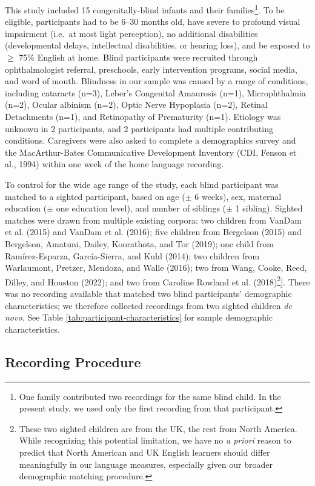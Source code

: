 \documentclass[
  man,floatsintext]{apa6}
\begin{document}
This study included 15 congenitally-blind infants and their families\footnote{One family contributed two recordings for the same blind child. In the present study, we used only the first recording from that participant.}. To be eligible, participants had to be 6--30 months old, have severe to profound visual impairment (i.e.~at most light perception), no additional disabilities (developmental delays, intellectual disabilities, or hearing loss), and be exposed to \(\geq\) 75\% English at home. Blind participants were recruited through ophthalmologist referral, preschools, early intervention programs, social media, and word of mouth. Blindness in our sample was caused by a range of conditions, including cataracts (n=3), Leber's Congenital Amaurosis (n=1), Microphthalmia (n=2), Ocular albinism (n=2), Optic Nerve Hypoplasia (n=2), Retinal Detachments (n=1), and Retinopathy of Prematurity (n=1). Etiology was unknown in 2 participants, and 2 participants had multiple contributing conditions. Caregivers were also asked to complete a demographics survey and the MacArthur-Bates Communicative Development Inventory (CDI, Fenson et al., 1994) within one week of the home language recording.

To control for the wide age range of the study, each blind participant was matched to a sighted participant, based on age (\(\pm\) 6 weeks), sex, maternal education (\(\pm\) one education level), and number of siblings (\(\pm\) 1 sibling). Sighted matches were drawn from multiple existing corpora: two children from VanDam et al. (2015) and VanDam et al. (2016); five children from Bergelson (2015) and Bergelson, Amatuni, Dailey, Koorathota, and Tor (2019); one child from Ramírez-Esparza, García-Sierra, and Kuhl (2014); two children from Warlaumont, Pretzer, Mendoza, and Walle (2016); two from Wang, Cooke, Reed, Dilley, and Houston (2022); and two from Caroline Rowland et al. (2018)\footnote{These two sighted children are from the UK, the rest from North America. While recognizing this potential limitation, we have no \emph{a priori} reason to predict that North American and UK English learners should differ meaningfully in our language measures, especially given our broader demographic matching procedure.}{]}. There was no recording available that matched two blind participants' demographic characteristics; we therefore collected recordings from two sighted children \emph{de novo}. See Table \ref{tab:participant-characteristics} for sample demographic characteristics.

\hypertarget{recording-procedure}{%
\subsection{Recording Procedure}\label{recording-procedure}}
\end{document}
